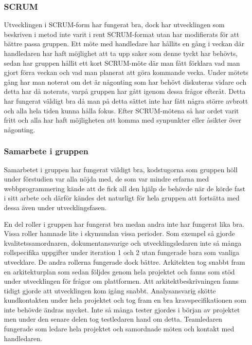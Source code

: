 \subsubsection{SCRUM}
Utvecklingen i SCRUM-form har fungerat bra,
dock har utvecklingen som beskriven i metod inte varit i rent SCRUM-format utan har modifierats för att bättre passa gruppen.
Ett möte med handledare har hållits en gång i veckan där handledaren har haft möjlighet att ta upp saker som denne tyckt har behövts,
sedan har gruppen hållit ett kort SCRUM-möte där man fått förklara vad man gjort förra veckan och vad man planerat
att göra kommande vecka. Under mötets gång har man noterat om det är någonting som har behövt diskuteras
vidare och detta har då noterats, varpå gruppen har gått igenom dessa frågor efteråt. Detta har fungerat väldigt bra då man på detta sättet inte har fått några större avbrott och alla hela tiden kunna hålla fokus. Efter SCRUM-mötena så har ordet varit fritt och alla har haft möjligheten att komma med synpunkter eller åsikter över någonting.

\subsubsection{Samarbete i gruppen}
Samarbetet i gruppen har fungerat väldigt bra, kodstugorna som gruppen höll under förstudien var alla nöjda med, de som var mindre erfarna med webbprogrammering kände att de fick all den hjälp de behövde när de körde fast i sitt arbete och därför kändes det naturligt för hela gruppen att fortsätta med dessa även under utvecklingsfasen. 

En del roller i gruppen har fungerat bra medan andra inte har fungerat lika bra. Vissa roller hamnade lite i skymundan vissa perioder. Som exempel så gjorde kvalitetssamordnaren, dokumentansvarige och utvecklingsledaren inte så många rollspecifika uppgifter under iteration 1 och 2 utan fungerade bara som vanliga utvecklare. De andra rollerna fungerade dock bättre. Arkitekten tog snabbt fram en arkitekturplan som sedan följdes genom hela projektet och fanns som stöd under utvecklingen för frågor om plattformen. Att arkitektbeskrivningen fanns tidigt gjorde att utvecklingen kom igång snabbt. Analysansvarig skötte kundkontakten under hela projektet och tog fram en bra kravspecifikationen som inte behövde ändras mycket. Inte så många tester gjordes i början av projektet men under den senare delen tog testledaren hand om detta. Teamledaren fungerade som ledare hela projektet och samordnade möten och kontakt med handledaren.    

